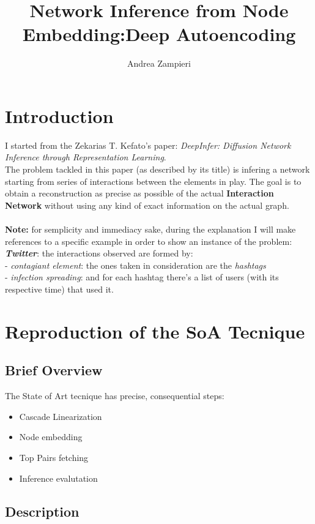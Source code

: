 \documentclass{article}
\author{Andrea Zampieri}
\title{Network Inference from Node Embedding:\newline Deep Autoencoding}
\newcommand\tab[1][1cm]{\hspace*{#1}}
\begin{document}
	\maketitle
	\newpage
	\section{Introduction} 
		I started from the Zekarias	T. Kefato's paper: \textit{DeepInfer: Diffusion Network Inference through Representation Learning}.\\
		The problem tackled in this paper (as described by its title) is infering a network starting from series of interactions between the elements in play.
		The goal is to obtain a reconstruction as precise as possible of the actual \textbf{Interaction Network} without using any kind of exact information on the actual graph.\\ 
		\\
		\textbf{Note:} for semplicity and immediacy sake, during the explanation I will make references to a specific example in order to show an instance of the problem:\\
		\tab \textbf{\textit{Twitter}}: the interactions observed are formed by:\\
			\tab\tab - \textit{contagiant element}: the ones taken in consideration are the \textit{hashtags} \\
			\tab\tab - \textit{infection spreading}: and for each hashtag there's a list of users (with its respective time) that used it.
	
	\section{Reproduction of the SoA Tecnique}
		\subsection{Brief Overview}
			The State of Art tecnique has precise, consequential steps:
			\begin{itemize}
				\item Cascade Linearization
				\item Node embedding
				\item Top Pairs fetching
				\item Inference evalutation
			\end{itemize}
		\subsection{Description}
			
		
\end{document}
